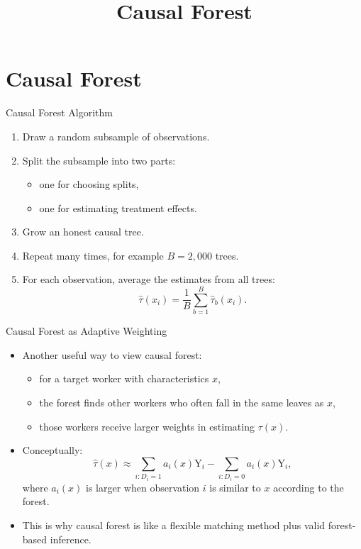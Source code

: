 \documentclass[hyperref={pdfpagelabels=false}]{beamer}
\begin{document}
\title[]
{Causal Forest}

\subtitle{}
\author{}
\institute{}
\date{}

\begin{frame}{}
  \titlepage
\end{frame}

\section{Causal Forest}

\begin{frame}{Causal Forest Algorithm}
\begin{enumerate}
  \item Draw a random subsample of observations.
  \vspace{0.15cm}
  \item Split the subsample into two parts:
  \begin{itemize}
    \item one for choosing splits,
    \item one for estimating treatment effects.
  \end{itemize}
  \vspace{0.15cm}
  \item Grow an honest causal tree.
  \vspace{0.15cm}
  \item Repeat many times, for example $B=2{,}000$ trees.
  \vspace{0.15cm}
  \item For each observation, average the estimates from all trees:
  \[
    \hat{\tau}(x_i)=\frac{1}{B}\sum_{b=1}^B \hat{\tau}_b(x_i).
  \]
\end{enumerate}
\end{frame}

\begin{frame}{Causal Forest as Adaptive Weighting}
\begin{itemize}
  \item Another useful way to view causal forest:
  \vspace{0.1cm}
  \begin{itemize}
    \item for a target worker with characteristics $x$,
    \item the forest finds other workers who often fall in the same leaves as $x$,
    \item those workers receive larger weights in estimating $\tau(x)$.
  \end{itemize}
  \vspace{0.25cm}
  \item Conceptually:
  \[
    \hat{\tau}(x)
    \approx
    \sum_{i:D_i=1} a_i(x)\mathrm{Y}_i
    -
    \sum_{i:D_i=0} a_i(x)\mathrm{Y}_i,
  \]
  where $a_i(x)$ is larger when observation $i$ is similar to $x$ according to the forest.
  \vspace{0.25cm}
  \item This is why causal forest is like a flexible matching method plus valid forest-based inference.
\end{itemize}
\end{frame}
\end{document}
